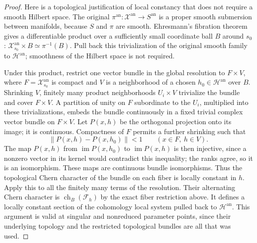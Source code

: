 \documentclass[11pt]{article}
\numberwithin{equation}{section}
\begin{document}
\begin{proof}
Here is a topological justification of local constancy that does
not require a smooth Hilbert space.  The original
\(\pi^{\mathrm{an}}:\mathcal X^{\mathrm{an}}\to S^{\mathrm{an}}\)
is a proper smooth submersion between manifolds, because \(S\)
and \(\pi\) are smooth.  Ehresmann's fibration theorem gives a
differentiable product over a sufficiently small coordinate ball \(B\)
around \(s_0\):
\(\mathcal X_{s_0}^{\mathrm{an}}\times B\simeq
\pi^{-1}(B)\).  Pull back this trivialization of the original smooth
family to \(\mathscr H^{\mathrm{an}}\); smoothness of the Hilbert
space is not required.

Under this product, restrict one vector bundle in the global
resolution to \(F\times V\), where \(F=\mathcal X_{s_0}^{\mathrm{an}}\)
is compact and \(V\) is a neighborhood of a chosen
\(h_0\in\mathscr H^{\mathrm{an}}\) over \(B\).  Shrinking \(V\),
finitely many product neighborhoods \(U_i\times V\) trivialize
the bundle and cover \(F\times V\).  A partition of unity on
\(F\) subordinate to the \(U_i\), multiplied into these
trivializations, embeds the bundle continuously in a fixed
trivial complex vector bundle on \(F\times V\).  Let \(P(x,h)\)
be the orthogonal projection onto its image; it is continuous.
Compactness of \(F\) permits a further shrinking such that
\[
 \lVert P(x,h)-P(x,h_0)\rVert<1\qquad(x\in F,\ h\in V).
\]
The map \(P(x,h)\) from \(\operatorname{im}P(x,h_0)\) to
\(\operatorname{im}P(x,h)\) is then injective, since a nonzero
vector in its kernel would contradict this inequality; the
ranks agree, so it is an isomorphism.  These maps are continuous
bundle isomorphisms.  Thus the topological Chern character of
the bundle on each fiber is locally constant in \(h\).
Apply this to all the finitely many terms of the resolution.
Their alternating Chern character is
\(\operatorname{ch}_B(\mathcal F_h)\) by the exact fiber
restriction above.  It defines a locally constant section of
the cohomology local system pulled back to
\(\mathscr H^{\mathrm{an}}\).  This argument is valid at singular
and nonreduced parameter points, since their underlying topology
and the restricted topological bundles are all that was used.


\end{proof}
\end{document}
